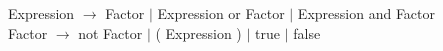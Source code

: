 \begin{center}
    Expression $\rightarrow$ Factor $|$ Expression or Factor $|$ Expression and Factor \\
    Factor $\rightarrow$ not Factor $|$ ( Expression ) $|$ true $|$ false \\
\end{center}